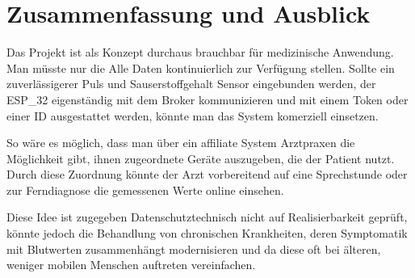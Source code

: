 \documentclass[12pt,oneside]{article}
\begin{document}
  
  \section{Zusammenfassung und Ausblick}
	Das Projekt ist als Konzept durchaus brauchbar für medizinische Anwendung. Man müsste nur die Alle Daten kontinuierlich zur Verfügung stellen. Sollte ein zuverlässigerer Puls und Sauserstoffgehalt Sensor eingebunden werden, der ESP\_32 eigenständig mit dem Broker kommunizieren und mit einem Token oder einer ID ausgestattet werden, könnte man das System komerziell einsetzen.\par
	So wäre es möglich, dass man über ein affiliate System Arztpraxen die Möglichkeit gibt, ihnen zugeordnete Geräte auszugeben, die der Patient nutzt. Durch diese Zuordnung könnte der Arzt vorbereitend auf eine Sprechstunde oder zur Ferndiagnose die gemessenen Werte online einsehen. \par
	Diese Idee ist zugegeben Datenschutztechnisch nicht auf Realisierbarkeit geprüft, könnte jedoch die Behandlung von chronischen Krankheiten, deren Symptomatik mit Blutwerten zusammenhängt modernisieren und da diese oft bei älteren, weniger mobilen Menschen auftreten vereinfachen.
  
  \clearpage 
  
  \listoffigures
  \lstlistoflistings
  
  
  
  
\end{document}
